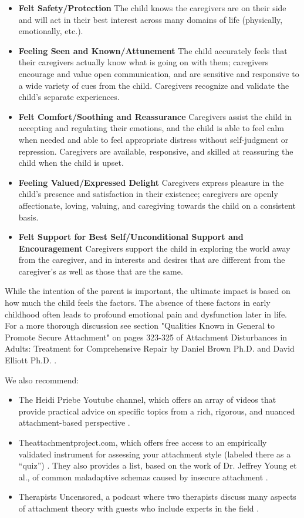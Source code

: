 \documentclass[12pt,letterpaper]{book}
\begin{document}
\begin{itemize}
    \item \textbf{Felt Safety/Protection} The child knows the caregivers are on their side and will act in their best interest across many domains of life (physically, emotionally, etc.).
    \item \textbf{Feeling Seen and Known/Attunement} The child accurately feels that their caregivers actually know what is going on with them; caregivers encourage and value open communication, and are sensitive and responsive to a wide variety of cues from the child. Caregivers recognize and validate the child's separate experiences.
    \item \textbf{Felt Comfort/Soothing and Reassurance} Caregivers assist the child in accepting and regulating their emotions, and the child is able to feel calm when needed and able to feel appropriate distress without self-judgment or repression. Caregivers are available, responsive, and skilled at reassuring the child when the child is upset.
    \item \textbf{Feeling Valued/Expressed Delight} Caregivers express pleasure in the child's presence and satisfaction in their existence; caregivers are openly affectionate, loving, valuing, and caregiving towards the child on a consistent basis.
    \item \textbf{Felt Support for Best Self/Unconditional Support and Encouragement} Caregivers support the child in exploring the world away from the caregiver, and in interests and desires that are different from the caregiver's as well as those that are the same.
\end{itemize}

While the intention of the parent is important, the ultimate impact is based on how much the child feels the factors. The absence of these factors in early childhood often leads to profound emotional pain and dysfunction later in life. For a more thorough discussion see section "Qualities Known in General to Promote Secure Attachment" on pages 323-325 of Attachment Disturbances in Adults: Treatment for Comprehensive Repair by Daniel Brown Ph.D. and David Elliott Ph.D. \cite{brownAttachmentDisturbances}.  

We also recommend:
\begin{itemize}
    \item The Heidi Priebe Youtube channel, which offers an array of videos that provide practical advice on specific topics from a rich, rigorous, and nuanced attachment-based perspective \cite{priebeYoutube}.
    \item Theattachmentproject.com, which offers free access to an empirically validated instrument for assessing your attachment style (labeled there as a “quiz”) \cite{attachmentProject}. They also provides a list, based on the work of Dr. Jeffrey Young et al., of common maladaptive schemas caused by insecure attachment \cite{earlyMalSchemas}.
    \item Therapists Uncensored, a podcast where two therapists discuss many aspects of attachment theory with guests who include experts in the field \cite{therapistsUncensored}.
\end{itemize}
\end{document}
